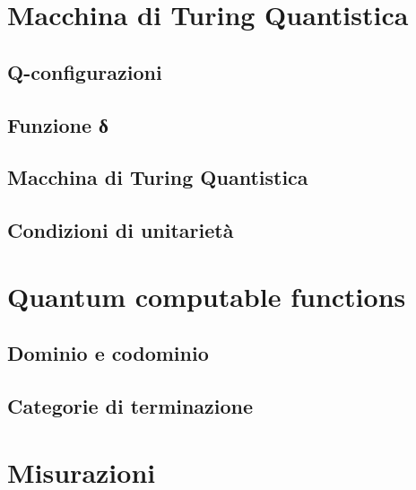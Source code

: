 \documentclass{beamer}
\begin{document}
\section{Macchina di Turing Quantistica}

\subsection{Q-configurazioni}

\subsection{Funzione δ}

\subsection{Macchina di Turing Quantistica}

\subsection{Condizioni di unitarietà}

\section{Quantum computable functions}

\subsection{Dominio e codominio}

\subsection{Categorie di terminazione}

\section{Misurazioni}
\end{document}
